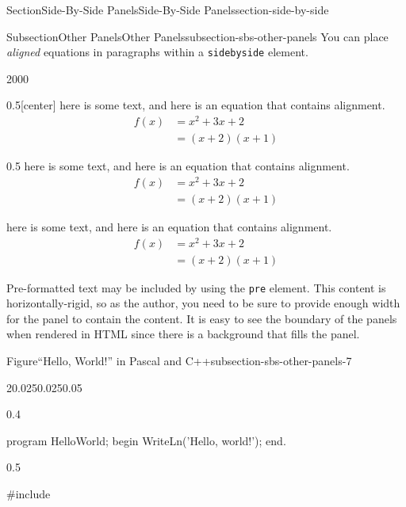 \documentclass[twoside,10pt,]{article}
\newcommand{\mono}[1]{\texttt{#1}}
\numberwithin{equation}{section}
\begin{document}
\begin{sectionptx}{Section}{Side-By-Side Panels}{}{Side-By-Side Panels}{}{}{section-side-by-side}
\begin{subsectionptx}{Subsection}{Other Panels}{}{Other Panels}{}{}{subsection-sbs-other-panels}
You can place \emph{aligned} equations in paragraphs within a \mono{sidebyside} element.%
\begin{sidebyside}{2}{0}{0}{0}%
\begin{sbspanel}{0.5}[center]%
here is some text, and here is an equation that contains alignment.%
\begin{align*}
f(x)&= x^2+3x+2\\
&=(x+2)(x+1)
\end{align*}
%
\end{sbspanel}%
\begin{sbspanel}{0.5}%
here is some text, and here is an equation that contains alignment.%
\begin{align*}
f(x)&= x^2+3x+2\\
&=(x+2)(x+1)
\end{align*}
%
\par
here is some text, and here is an equation that contains alignment.%
\begin{align*}
f(x)&= x^2+3x+2\\
&=(x+2)(x+1)
\end{align*}
%
\end{sbspanel}%
\end{sidebyside}%
\par
Pre-formatted text may be included by using the \mono{pre} element.  This content is horizontally-rigid, so as the author, you need to be sure to provide enough width for the panel to contain the content.  It is easy to see the boundary of the panels when rendered in HTML since there is a background that fills the panel.%
\begin{figureptx}{Figure}{``Hello, World!'' in Pascal and C++}{subsection-sbs-other-panels-7}{}%
\begin{sidebyside}{2}{0.025}{0.025}{0.05}%
\begin{sbspanel}{0.4}%
\begin{preformatted}
program HelloWorld;
begin
  WriteLn('Hello, world!');
end.
\end{preformatted}
\end{sbspanel}%
\begin{sbspanel}{0.5}%
\begin{preformatted}
#include


\end{preformatted}
\end{sbspanel}
\end{sidebyside}
\end{figureptx}
\end{subsectionptx}
\end{sectionptx}
\end{document}
